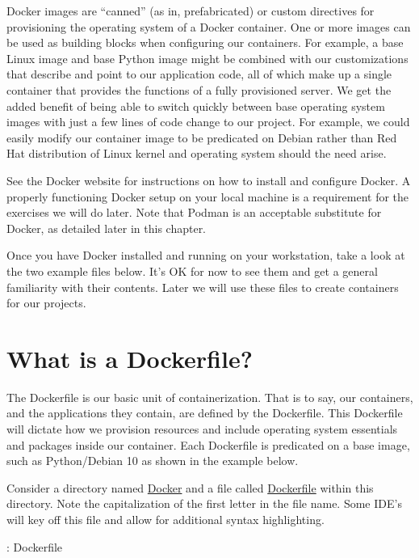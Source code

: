 \justify{}
Docker images are ``canned'' (as in, prefabricated) or custom directives
for provisioning the operating system of a Docker container. One or more
images can be used as building blocks when configuring our containers.
For example, a base Linux image and base Python image might be combined
with our customizations that describe and point to our application code,
all of which make up a single container that provides the functions of
a fully provisioned server. We get the added
benefit of being able to switch quickly between base operating system
images with just a few lines of code change to our project. For example,
we could easily modify our container image to be predicated on Debian
rather than Red Hat distribution of Linux kernel and operating system
should the need arise.

\justify{}
See the Docker website for instructions on how to install and configure
Docker. A properly functioning Docker setup on your local machine is a requirement
for the exercises we will do later. Note that Podman is an
acceptable substitute
for Docker, as detailed later in this chapter.

\justify{}
Once you have Docker installed and running on your workstation, take a
look at the two example files below. It's OK for now to see them and get
a general familiarity with their contents. Later we will use these files
to create containers for our projects.

\section{What is a Dockerfile?}
\justify{}
The Dockerfile is our basic unit of containerization. That is to say,
our containers, and the applications they contain, are defined by the
Dockerfile. This Dockerfile will dictate how we provision resources and
include operating system essentials and packages inside our container.
Each Dockerfile is predicated on a base image, such as Python/Debian 10
as shown in the example below.

\justify{}
Consider a directory named
\href{https://github.com/hotpeppersec/rapid_secdev_framework/tree/master/docker}{Docker}
and a file called
\href{https://github.com/hotpeppersec/rapid_secdev_framework/blob/master/docker/Dockerfile}{Dockerfile}
within this directory. Note the capitalization of the first letter in the file name. Some IDE's will key off this file and allow for additional syntax highlighting.

\justify{}
\begin{mybox}{\thetcbcounter: Dockerfile}
  
\end{mybox}

